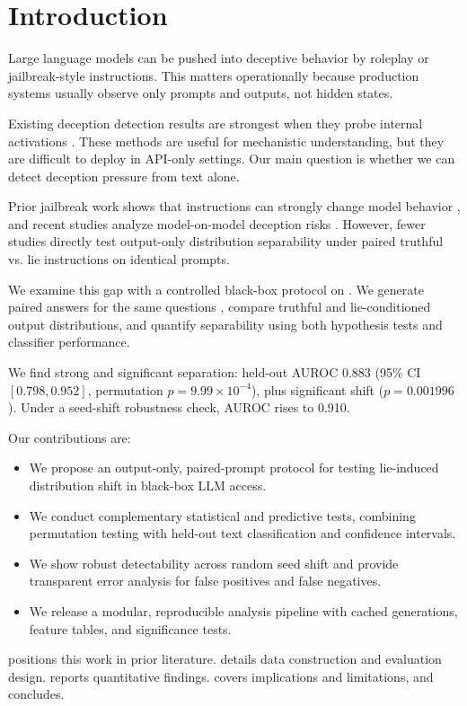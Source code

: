 \section{Introduction}
\label{sec:introduction}

Large language models can be pushed into deceptive behavior by roleplay or jailbreak-style instructions. This matters operationally because production systems usually observe only prompts and outputs, not hidden states.

 Existing deception detection results are strongest when they probe internal activations \citep{goldowskydill2025detecting,long2025truthful}. These methods are useful for mechanistic understanding, but they are difficult to deploy in API-only settings. Our main question is whether we can detect deception pressure from text alone.

 Prior jailbreak work shows that instructions can strongly change model behavior \citep{qiu2023latent,wei2023opensesame}, and recent studies analyze model-on-model deception risks \citep{geifman2024assessment,dey2024unmasking}. However, fewer studies directly test output-only distribution separability under paired truthful vs.
lie instructions on identical prompts.

We examine this gap with a controlled black-box protocol on \gptmodel. We generate paired answers for the same \truthfulqa questions \citep{lin2022truthfulqa}, compare truthful and lie-conditioned output distributions, and quantify separability using both hypothesis tests and classifier performance.

 We find strong and significant separation: held-out AUROC 0.883 (95\% CI $[0.798, 0.952]$, permutation $p=9.99\times10^{-4}$), plus significant \mmd shift ($p=0.001996$). Under a seed-shift robustness check, AUROC rises to 0.910.

Our contributions are:
\begin{itemize}[leftmargin=*,itemsep=0pt,topsep=0pt]
    \item We propose an output-only, paired-prompt protocol for testing lie-induced distribution shift in black-box LLM access.
    \item We conduct complementary statistical and predictive tests, combining \mmd permutation testing with held-out text classification and confidence intervals.
    \item We show robust detectability across random seed shift and provide transparent error analysis for false positives and false negatives.
    \item We release a modular, reproducible analysis pipeline with cached generations, feature tables, and significance tests.
\end{itemize}

  positions this work in prior literature.  details data construction and evaluation design.  reports quantitative findings.  covers implications and limitations, and  concludes.
